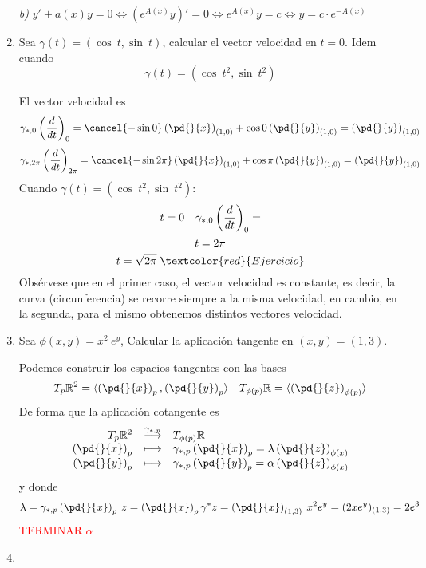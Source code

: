 \begin{enumerate}
\begin{sol}
        \textit{b)} $y'+a(x)y=0 \iff (e^{A(x)}y)'=0 \iff e^{A(x)}y=c \iff y=c \cdot e^{-A(x)}$
    \end{sol}
    \item Sea $\gamma(t)=(\cos\: t, \sin \: t)$, calcular el vector velocidad en $t=0$. Idem cuando $$\gamma(t)=(\cos\: t^2, \sin \: t^2)$$
    \begin{sol}
        El vector velocidad es 
        $$\gamma_{*,0}\left(\dfrac{d}{dt}\right)_0=\cancel{-\sin 0} \left( \pd{}{x}\right)_{(1,0)}+\cos0\left( \pd{}{y}\right)_{(1,0)}=\left( \pd{}{y}\right)_{(1,0)}$$     $$\gamma_{*,2\pi}\left(\dfrac{d}{dt}\right)_{2\pi}=\cancel{-\sin 2\pi} \left( \pd{}{x}\right)_{(1,0)}+\cos\pi\left( \pd{}{y}\right)_{(1,0)}=\left( \pd{}{y}\right)_{(1,0)}$$
        Cuando $\gamma(t)=(\cos\: t^2, \sin \: t^2)$:
        $$t=0 \quad \gamma_{*,0}\left(\dfrac{d}{dt}\right)_0=\hfill$$
        $$t=2\pi\hfill$$
        $$t=\sqrt{2\pi} \;  \textcolor{red}{Ejercicio}\hfill$$
        Obsérvese que en el primer caso, el vector velocidad es constante, es decir, la curva (circunferencia) se recorre siempre a la misma velocidad, en cambio, en la segunda, para el mismo obtenemos distintos vectores velocidad.
    \end{sol}
    \item Sea $\phi(x,y)=x^2 \: e^y$, Calcular la aplicación tangente en $(x,y)=(1,3)$.
    \begin{sol}
        Podemos construir los espacios tangentes con las bases
        $$T_p\mathbb R^2=\langle\left(\pd{}{x}\right)_p, \left(\pd{}{y}\right)_p\rangle \quad T_{\phi(p)}\mathbb R= \langle \left(\pd{}{z}\right)_{\phi(p)}\rangle$$
        De forma que la aplicación cotangente es
        $$\begin{array}{rcl}
             T_p\mathbb R^2 & \overset{\gamma_{*,p}}{\longrightarrow} & T_{\phi(p)}\mathbb R  \\
             \left(\pd{}{x}\right)_p & \longmapsto & \gamma_{*,p}\left(\pd{}{x}\right)_p=\lambda\left(\pd{}{z}\right)_{\phi(x)} \\
            \left(\pd{}{y}\right)_p & \longmapsto & \gamma_{*,p}\left(\pd{}{y}\right)_p=\alpha \left(\pd{}{z}\right)_{\phi(x)}
        \end{array}$$
        y donde         $$\lambda=\gamma_{*,p}\left(\pd{}{x}\right)_p \: z=\left(\pd{}{x}\right)_p \gamma^*z=\left(\pd{}{x}\right)_{(1,3)} \: x^2 e^y=(2xe^y)_{(1,3)}=2e^3$$
        \textcolor{red}{TERMINAR $\alpha$}
    \end{sol}
    \item 

\end{enumerate}

